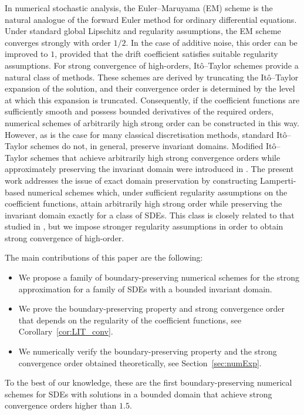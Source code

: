 \documentclass[11pt]{amsart}
\begin{document}
{In numerical stochastic analysis, the Euler--Maruyama (EM) scheme is the natural analogue of the forward Euler method for ordinary differential equations. Under standard global Lipschitz and regularity assumptions, the EM scheme converges strongly with order $1/2$. In the case of additive noise, this order can be improved to $1$, provided that the drift coefficient satisfies suitable regularity assumptions. For strong convergence of high-orders, Itô--Taylor schemes provide a natural class of methods. These schemes are derived by truncating the Itô--Taylor expansion of the solution, and their convergence order is determined by the level at which this expansion is truncated. Consequently, if the coefficient functions are sufficiently smooth and possess bounded derivatives of the required orders, numerical schemes of arbitrarily high strong order can be constructed in this way. However, as is the case for many classical discretisation methods, standard Itô--Taylor schemes do not, in general, preserve invariant domains. Modified Itô--Taylor schemes that achieve arbitrarily high strong convergence orders while approximately preserving the invariant domain were introduced in \cite{MR2481529}. The present work addresses the issue of exact domain preservation by constructing Lamperti-based numerical schemes which, under sufficient regularity assumptions on the coefficient functions, attain arbitrarily high strong order while preserving the invariant domain exactly for a class of SDEs. This class is closely related to that studied in \cite{MR4737060}, but we impose stronger regularity assumptions in order to obtain strong convergence of high-order.

The main contributions of this paper are the following:
\begin{itemize}
[
    topsep=3pt,
    itemsep=0pt,
    parsep=0pt,
    partopsep=0pt
]
\item We propose a family of boundary-preserving numerical schemes for the strong approximation for a family of SDEs with a bounded invariant domain.
\item We prove the boundary-preserving property and strong convergence order that depends on the regularity of the coefficient functions, see Corollary~\ref{cor:LIT_conv}.
\item We numerically verify the boundary-preserving property and the strong convergence order obtained theoretically, see Section~\ref{sec:numExp}.
\end{itemize}
To the best of our knowledge, these are the first boundary-preserving numerical schemes for SDEs with solutions in a bounded domain that achieve strong convergence orders higher than $1.5$. 

}
\end{document}

